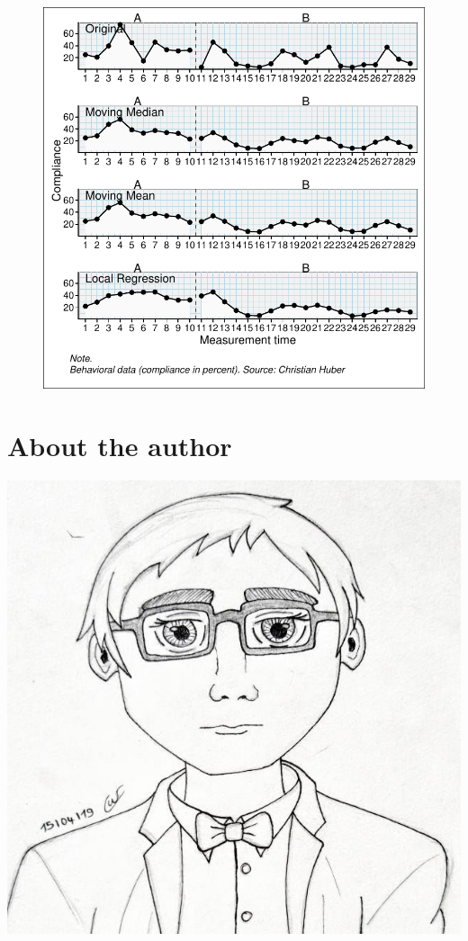 \documentclass[
  letterpaper,
  DIV=11,
  numbers=noendperiod]{scrreprt}
\begin{document}
\begin{figure}[H]

{\centering \includegraphics{./app_supseded_functions_files/figure-pdf/unnamed-chunk-7-1.pdf}

}

\end{figure}

\hypertarget{about-the-author}{%
\chapter{About the author}\label{about-the-author}}

\includegraphics{./images/wilbert3.jpg}
\end{document}
